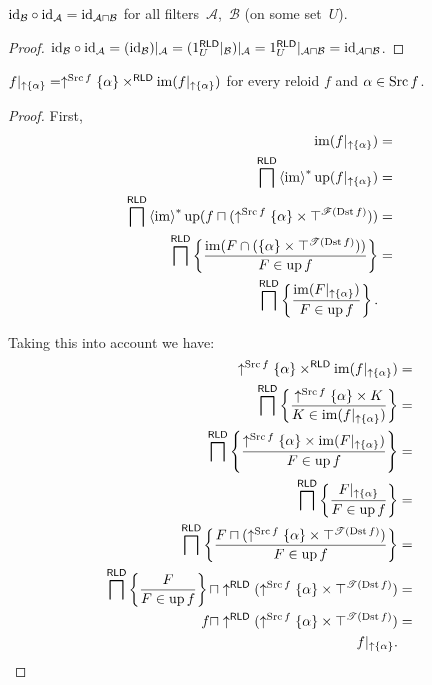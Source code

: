\begin{prop}\label{rld-id-comp}
${\operatorname{id}}_{\mathcal{B}}\circ{\operatorname{id}}_{\mathcal{A}} = {\operatorname{id}}_{\mathcal{A}\sqcap\mathcal{B}}$ for all filters~$\mathcal{A}$,~$\mathcal{B}$ (on some set~$U$).
\end{prop}

\begin{proof}
${\operatorname{id}}_{\mathcal{B}}\circ{\operatorname{id}}_{\mathcal{A}} =
({\operatorname{id}}_{\mathcal{B}})|_{\mathcal{A}} = (1^{\mathsf{RLD}}_U|_{\mathcal{B}})|_{\mathcal{A}} = 1^{\mathsf{RLD}}_U|_{\mathcal{A}\sqcap\mathcal{B}} = 
{\operatorname{id}}_{\mathcal{A}\sqcap\mathcal{B}}$.
\end{proof}

\begin{thm}
$f|_{\uparrow\{\alpha\}}=\uparrow^{\operatorname{Src} f}\{\alpha\}\times^{\mathsf{RLD}}\operatorname{im}(f|_{\uparrow\{\alpha\}})$
for every reloid $f$ and $\alpha\in\operatorname{Src} f$.\end{thm}
\begin{proof}
First,
\begin{align*}
\operatorname{im}(f|_{\uparrow \{\alpha\}}) & =\\
\bigsqcap^{\mathsf{RLD}}\left\langle \operatorname{im}\right\rangle ^{\ast}\operatorname{up}(f|_{\uparrow \{\alpha\}}) & =\\
\bigsqcap^{\mathsf{RLD}}\left\langle \operatorname{im}\right\rangle ^{\ast}\operatorname{up}(f\sqcap(\uparrow^{\operatorname{Src} f}\{\alpha\}\times\top^{\mathscr{F}(\operatorname{Dst} f)})) & =\\
\bigsqcap^{\mathsf{RLD}}\left\{ \frac{\operatorname{im}(F\cap(\{\alpha\}\times\top^{\mathscr{T}(\operatorname{Dst} f)}))}{F\in\operatorname{up} f}\right\} & =\\
\bigsqcap^{\mathsf{RLD}}\left\{ \frac{\operatorname{im}(F|_{\uparrow \{\alpha\}})}{F\in\operatorname{up} f}\right\}.
\end{align*}


Taking this into account we have:
\begin{align*}
\uparrow^{\operatorname{Src} f}\{\alpha\}\times^{\mathsf{RLD}}\operatorname{im}(f|_{\uparrow \{\alpha\}}) & =\\
\bigsqcap^{\mathsf{RLD}}\left\{ \frac{\uparrow^{\operatorname{Src} f}\{\alpha\}\times K}{K\in\operatorname{im}(f|_{\uparrow \{\alpha\}})}\right\} & =\\
\bigsqcap^{\mathsf{RLD}}\left\{ \frac{\uparrow^{\operatorname{Src} f}\{\alpha\}\times\operatorname{im}(F|_{\uparrow \{\alpha\}})}{F\in\operatorname{up} f}\right\} & =\\
\bigsqcap^{\mathsf{RLD}}\left\{ \frac{F|_{\uparrow \{\alpha\}}}{F\in\operatorname{up} f}\right\} & =\\
\bigsqcap^{\mathsf{RLD}}\left\{ \frac{F\sqcap(\uparrow^{\operatorname{Src} f}\{\alpha\}\times\top^{\mathscr{T}(\operatorname{Dst} f)})}{F\in\operatorname{up} f}\right\} & =\\
\bigsqcap^{\mathsf{RLD}}\left\{ \frac{F}{F\in\operatorname{up} f}\right\}\sqcap\uparrow^{\mathsf{RLD}}(\uparrow^{\operatorname{Src} f}\{\alpha\}\times\top^{\mathscr{T}(\operatorname{Dst} f)}) & =\\
f\sqcap\uparrow^{\mathsf{RLD}}(\uparrow^{\operatorname{Src} f}\{\alpha\}\times\top^{\mathscr{T}(\operatorname{Dst} f)}) & =\\
f|_{\uparrow \{\alpha\}}.
\end{align*}
\end{proof}
